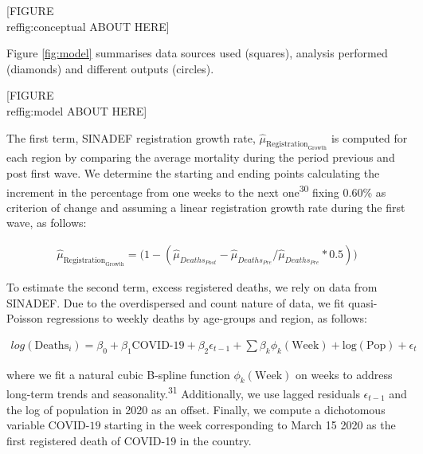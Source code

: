 \documentclass[
]{article}
\begin{document}
\begin{center}
  [FIGURE \\ref{fig:conceptual} ABOUT HERE]
\end{center}

Figure \ref{fig:model} summarises data sources used (squares), analysis performed (diamonds) and different outputs (circles).

\begin{center}
  [FIGURE \\ref{fig:model} ABOUT HERE]
\end{center}

The first term, SINADEF registration growth rate, \(\widehat{\mu}_{\text{Registration}_\text{Growth}}\) is computed for each region by comparing the average mortality during the period previous and post first wave. We determine the starting and ending points calculating the increment in the percentage from one weeks to the next one\textsuperscript{30} fixing 0.60\% as criterion of change and assuming a linear registration growth rate during the first wave, as follows:

\begin{equation}
\label{eq:reggrowth}
   \begin{aligned}
  \widehat{\mu}_{\text{Registration}_\text{Growth}} = \big(1-(\hat\mu_{Deaths_{Post}}-\hat\mu_{Deaths_{Pre}}/\hat\mu_{Deaths_{Pre}}*0.5)\big)
   \end{aligned}      
\end{equation}

To estimate the second term, excess registered deaths, we rely on data from SINADEF. Due to the overdispersed and count nature of data, we fit quasi-Poisson regressions to weekly deaths by age-groups and region, as follows:

\begin{equation}
  \label{eq:registered}
  \begin{aligned}
  log(\text{Deaths}_{i})=\beta_0+\beta_1\text{COVID-19}+\beta_2\epsilon_{t-1}+
  \sum\beta_k\phi_{k}(\text{Week})+
  \text{log}(\text{Pop})+\epsilon_{t}
   \end{aligned}  
\end{equation}

where we fit a natural cubic B-spline function \(\phi_{k}(\text{Week})\) on weeks to address long-term trends and seasonality.\textsuperscript{31} Additionally, we use lagged residuals \(\epsilon_{t-1}\) and the log of population in 2020 as an offset. Finally, we compute a dichotomous variable \(\text{COVID-19}\) starting in the week corresponding to March 15 2020 as the first registered death of COVID-19 in the country.
\end{document}

